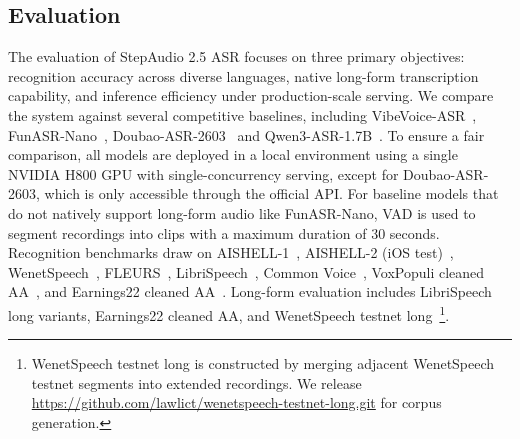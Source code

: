 
\subsection{Evaluation}

The evaluation of StepAudio 2.5 ASR focuses on three primary objectives: recognition accuracy across diverse languages, native long-form transcription capability, and inference efficiency under production-scale serving. We compare the system against several competitive baselines, including VibeVoice-ASR~\citep{peng2026vibevoiceasrtechnicalreport}, FunASR-Nano~\citep{an2025funasrtechnicalreport}, Doubao-ASR-2603~\citep{bai2024seed} and Qwen3-ASR-1.7B~\citep{shi2026qwen3asrtechnicalreport}. To ensure a fair comparison, all models are deployed in a local environment using a single NVIDIA H800 GPU with single-concurrency serving, except for Doubao-ASR-2603, which is only accessible through the official API. For baseline models that do not natively support long-form audio like FunASR-Nano, VAD is used to segment recordings into clips with a maximum duration of 30 seconds. Recognition benchmarks draw on AISHELL-1~\citep{bu2017aishell}, AISHELL-2 (iOS test)~\citep{du2018aishell2}, WenetSpeech~\citep{zhang2022wenetspeech}, FLEURS~\citep{conneau2022fleurs}, LibriSpeech~\citep{panayotov2015librispeech}, Common Voice~\citep{ardila2020commonvoice}, VoxPopuli cleaned AA~\citep{artificialanalysis2026voxpopulicleaned}, and Earnings22 cleaned AA~\citep{artificialanalysis2026earnings22cleaned}. Long-form evaluation includes LibriSpeech long variants, Earnings22 cleaned AA, and WenetSpeech testnet long~\footnote{
WenetSpeech testnet long is constructed by merging adjacent WenetSpeech testnet segments into extended recordings. We release \url{https://github.com/lawlict/wenetspeech-testnet-long.git} for corpus generation.}.


